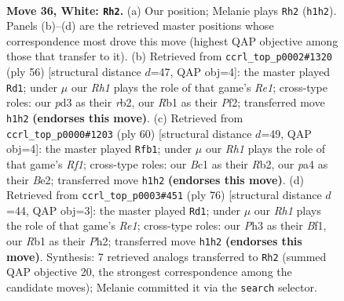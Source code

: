 \documentclass[11pt]{article}
\begin{document}
\clearpage

\begin{figure}[p]\centering
\begin{subfigure}{0.46\textwidth}\centering
\resizebox{\linewidth}{!}{%
\newchessgame
\chessboard[
  setfen={r7/5pkr/5n2/8/p3p2p/3p3P/PP3P2/1RB1K2R w - - 12 36},
  showmover=false,
  pgfstyle=straightmove, color=movearrow, markmove={h1-h2}
]}
\caption{}
\end{subfigure}\hfill
\begin{subfigure}{0.46\textwidth}\centering
\resizebox{\linewidth}{!}{%
\newchessgame
\chessboard[
  setfen={5rk1/5ppp/p7/4R1P1/3pP3/8/1rP2PP1/4R1K1 w - - 0 29},
  showmover=false,
  pgfstyle=straightmove, color=movearrow, markmove={e1-d1}
]}
\caption{}
\end{subfigure}
\\[4pt]
\begin{subfigure}{0.46\textwidth}\centering
\resizebox{\linewidth}{!}{%
\newchessgame
\chessboard[
  setfen={r4r2/6pk/5n1p/3p4/4p3/4P3/1R2BPPP/5RK1 w - - 1 31},
  showmover=false,
  pgfstyle=straightmove, color=movearrow, markmove={f1-b1}
]}
\caption{}
\end{subfigure}\hfill
\begin{subfigure}{0.46\textwidth}\centering
\resizebox{\linewidth}{!}{%
\newchessgame
\chessboard[
  setfen={8/2r1nk1p/1p2r1p1/p2p4/5PP1/P4R2/1P5P/1K2RB2 w - - 12 39},
  showmover=false,
  pgfstyle=straightmove, color=movearrow, markmove={e1-d1}
]}
\caption{}
\end{subfigure}
\caption{\textbf{Move 36, White: \texttt{Rh2}.} (a) Our position; Melanie plays \texttt{Rh2} (\texttt{h1h2}). Panels (b)--(d) are the retrieved master positions whose correspondence most drove this move (highest QAP objective among those that transfer to it). (b) Retrieved from \texttt{ccrl\_top\_p0002\#1320} (ply 56) [structural distance $d$=47, QAP obj=4]: the master played \texttt{Rd1}; under $\mu$ our \emph{Rh1} plays the role of that game's \emph{Re1}; cross-type roles: our \emph{p}d3 as their \emph{r}b2, our \emph{R}b1 as their \emph{P}f2; transferred move \texttt{h1h2} \textbf{(endorses this move)}. (c) Retrieved from \texttt{ccrl\_top\_p0000\#1203} (ply 60) [structural distance $d$=49, QAP obj=4]: the master played \texttt{Rfb1}; under $\mu$ our \emph{Rh1} plays the role of that game's \emph{Rf1}; cross-type roles: our \emph{B}c1 as their \emph{R}b2, our \emph{p}a4 as their \emph{B}e2; transferred move \texttt{h1h2} \textbf{(endorses this move)}. (d) Retrieved from \texttt{ccrl\_top\_p0003\#451} (ply 76) [structural distance $d$=44, QAP obj=3]: the master played \texttt{Rd1}; under $\mu$ our \emph{Rh1} plays the role of that game's \emph{Re1}; cross-type roles: our \emph{P}h3 as their \emph{B}f1, our \emph{R}b1 as their \emph{P}h2; transferred move \texttt{h1h2} \textbf{(endorses this move)}. Synthesis: 7 retrieved analogs transferred to \texttt{Rh2} (summed QAP objective 20, the strongest correspondence among the candidate moves); Melanie committed it via the \texttt{search} selector.}
\label{fig:thought-m70}
\end{figure}
\end{document}
